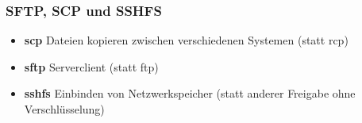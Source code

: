 \begin{frame}
\frametitle{SFTP, SCP und SSHFS}
\begin{itemize}
\item \textbf{scp} Dateien kopieren zwischen verschiedenen Systemen (statt rcp)
\pause
\item \textbf{sftp} Serverclient (statt ftp)
\pause
\item \textbf{sshfs} Einbinden von Netzwerkspeicher (statt anderer Freigabe ohne Verschlüsselung)
\end{itemize}
\end{frame}